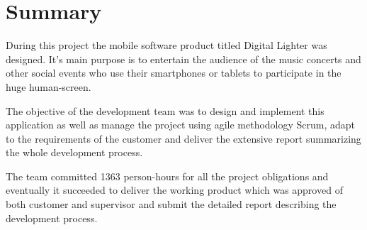 \section{Summary}
During this project the mobile software product titled Digital Lighter was designed. It's main purpose is to entertain the audience of the music concerts and other social events who use their smartphones or tablets to participate in the huge human-screen.

The objective of the development team was to design and implement this application as well as manage the project using agile methodology Scrum, adapt to the requirements of the customer and deliver the extensive report summarizing the whole development process.

The team committed 1363 person-hours for all the project obligations and eventually it succeeded to deliver the working product which was approved of both customer and supervisor and submit the detailed report describing the development process.

